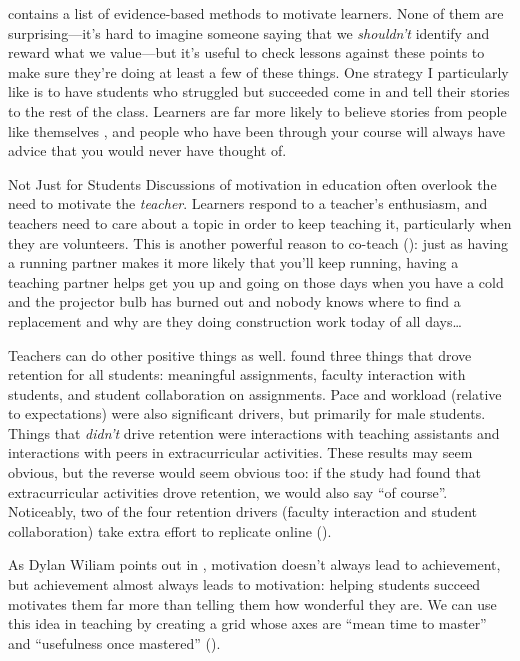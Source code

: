 \cite{Ambr2010} contains a list of evidence-based methods to motivate
learners. None of them are surprising---it's hard to imagine someone
saying that we \emph{shouldn't} identify and reward what we value---but it's
useful to check lessons against these points to make sure they're doing
at least a few of these things. One strategy I particularly like is to
have students who struggled but succeeded come in and tell their stories
to the rest of the class. Learners are far more likely to believe
stories from people like themselves \cite{Mill2016a}, and people who
have been through your course will always have advice that you would
never have thought of.

\begin{aside}{Not Just for Students}
  Discussions of motivation in education often overlook the need to
  motivate the \emph{teacher}. Learners respond to a teacher's enthusiasm,
  and teachers need to care about a topic in order to keep teaching it,
  particularly when they are volunteers. This is another powerful reason
  to co-teach (): just as having a
  running partner makes it more likely that you'll keep running, having
  a teaching partner helps get you up and going on those days when you
  have a cold and the projector bulb has burned out and nobody knows
  where to find a replacement and why are they doing construction work
  today of all days{\ldots}
\end{aside}

Teachers can do other positive things as well. \cite{Bark2014} found
three things that drove retention for all students: meaningful
assignments, faculty interaction with students, and student
collaboration on assignments. Pace and workload (relative to
expectations) were also significant drivers, but primarily for male
students. Things that \emph{didn't} drive retention were interactions with
teaching assistants and interactions with peers in extracurricular
activities. These results may seem obvious, but the reverse would seem
obvious too: if the study had found that extracurricular activities
drove retention, we would also say ``of course''. Noticeably, two of the
four retention drivers (faculty interaction and student collaboration)
take extra effort to replicate online ().


As Dylan Wiliam points out in \cite{Hend2017}, motivation doesn't
always lead to achievement, but achievement almost always leads to
motivation: helping students succeed motivates them far more than
telling them how wonderful they are. We can use this idea in teaching by
creating a grid whose axes are ``mean time to master'' and ``usefulness
once mastered'' ().

